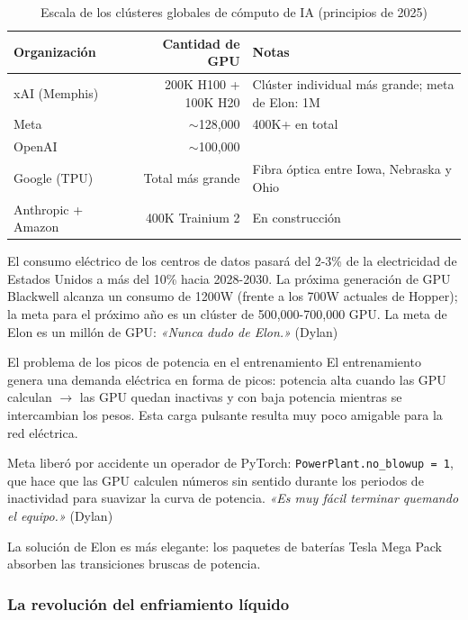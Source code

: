 \documentclass[a4paper]{article}
\begin{document}
\begin{table}[H]
\centering
\begin{tabular}{lrl}
\toprule
\textbf{Organización} & \textbf{Cantidad de GPU} & \textbf{Notas} \\
\midrule
xAI (Memphis) & 200K H100 + 100K H20 & Clúster individual más grande; meta de Elon: 1M \\
Meta & $\sim$128,000 & 400K+ en total \\
OpenAI & $\sim$100,000 & \\
Google (TPU) & Total más grande & Fibra óptica entre Iowa, Nebraska y Ohio \\
Anthropic + Amazon & 400K Trainium 2 & En construcción \\
\bottomrule
\end{tabular}
\caption{Escala de los clústeres globales de cómputo de IA (principios de 2025)}
\end{table}

El consumo eléctrico de los centros de datos pasará del 2-3\% de la electricidad de Estados Unidos a más del 10\% hacia 2028-2030. La próxima generación de GPU Blackwell alcanza un consumo de 1200W (frente a los 700W actuales de Hopper); la meta para el próximo año es un clúster de 500,000-700,000 GPU. La meta de Elon es un millón de GPU: \textit{«Nunca dudo de Elon.»} (Dylan)

\begin{knowledgebox}{El problema de los picos de potencia en el entrenamiento}
El entrenamiento genera una demanda eléctrica en forma de picos: potencia alta cuando las GPU calculan $\to$ las GPU quedan inactivas y con baja potencia mientras se intercambian los pesos. Esta carga pulsante resulta muy poco amigable para la red eléctrica.

Meta liberó por accidente un operador de PyTorch: \texttt{PowerPlant.no\_blowup = 1}, que hace que las GPU calculen números sin sentido durante los periodos de inactividad para suavizar la curva de potencia. \textit{«Es muy fácil terminar quemando el equipo.»} (Dylan)

La solución de Elon es más elegante: los paquetes de baterías Tesla Mega Pack absorben las transiciones bruscas de potencia.
\end{knowledgebox}

\subsubsection{La revolución del enfriamiento líquido}
\end{document}
